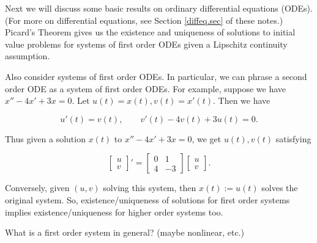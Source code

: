 Next we will discuss some basic results on ordinary differential equations (ODEs). (For more on differential equations, see Section \ref{diffeq.sec} of these notes.) Picard's Theorem gives us the existence and uniqueness of solutions to initial value problems for systems of first order ODEs given a Lipschitz continuity assumption.

Also consider systems of first order ODEs. In particular, we can phrase a second order ODE as a system of first order ODEs. For example, suppose we have \(x'' - 4x' + 3x = 0\). Let \(u(t) = x(t), v(t) = x'(t)\). Then we have

\[
u'(t) = v(t), \qquad v'(t) - 4 v(t) + 3u(t) = 0.
\]

Thus given a solution \(x(t)\) to \(x'' -4 x' + 3x = 0\), we get \(u(t), v(t)\) satisfying

\begin{equation}
\begin{bmatrix}
u \\
v \end{bmatrix}' = \begin{bmatrix}0 & 1 \\
4 & -3
\end{bmatrix} \begin{bmatrix}
u \\
v \end{bmatrix}.
\end{equation}

Conversely, given \((u, v)\) solving this system, then \(x(t) := u(t)\) solves the original system. So, existence/uniqueness of solutions for first order systems implies existence/uniqueness for higher order systems too.

What is a first order system in general? (maybe nonlinear, etc.)

